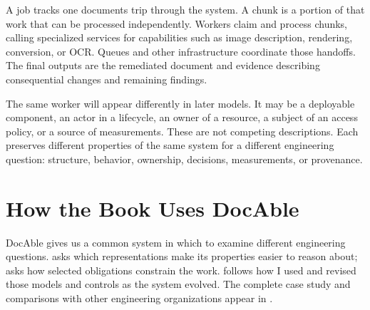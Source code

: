 

A job tracks one document\textquotesingle s trip through the system. A chunk is a portion of that work that can be processed independently. Workers claim and process chunks, calling specialized services for capabilities such as image description, rendering, conversion, or OCR. Queues and other infrastructure coordinate those handoffs. The final outputs are the remediated document and evidence describing consequential changes and remaining findings.


The same worker will appear differently in later models. It may be a deployable component, an actor in a lifecycle, an owner of a resource, a subject of an access policy, or a source of measurements. These are not competing descriptions. Each preserves different properties of the same system for a different engineering question: structure, behavior, ownership, decisions, measurements, or provenance.

\section{How the Book Uses DocAble}\label{heading:how-the-book-uses-docable}



DocAble gives us a common system in which to examine different engineering questions.  asks which representations make its properties easier to reason about;  asks how selected obligations constrain the work.  follows how I used and revised those models and controls as the system evolved. The complete case study and comparisons with other engineering organizations appear in .

